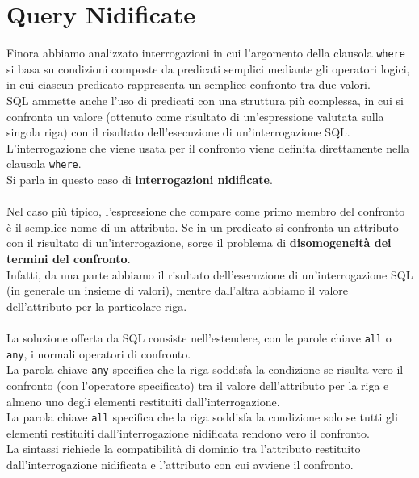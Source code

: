 \chapter{Query Nidificate}
Finora abbiamo analizzato interrogazioni in cui l'argomento della clausola \texttt{where} si basa su condizioni composte da predicati semplici mediante gli operatori logici, in cui ciascun predicato rappresenta un semplice confronto tra due valori.\\
SQL ammette anche l'uso di predicati con una struttura più complessa, in cui si confronta un valore (ottenuto come risultato di un'espressione valutata sulla singola riga) con il risultato dell'esecuzione di un'interrogazione SQL. L'interrogazione che viene usata per il confronto viene definita direttamente nella clausola \texttt{where}.\\
Si parla in questo caso di \textbf{interrogazioni nidificate}.\\\\
Nel caso più tipico, l'espressione che compare come primo membro del confronto è il semplice nome di un attributo. Se in un predicato si confronta un attributo con il risultato di un'interrogazione, sorge il problema di \textbf{disomogeneità dei termini del confronto}.\\
Infatti, da una parte abbiamo il risultato dell'esecuzione di un'interrogazione SQL (in generale un insieme di valori), mentre dall'altra abbiamo il valore dell'attributo per la particolare riga.\\\\
La soluzione offerta da SQL consiste nell'estendere, con le parole chiave \texttt{all} o \texttt{any}, i normali operatori di confronto.\\
La parola chiave \texttt{any} specifica che la riga soddisfa la condizione se risulta vero il confronto (con l'operatore specificato) tra il valore dell'attributo per la riga e almeno uno degli elementi restituiti dall'interrogazione.\\
La parola chiave \texttt{all} specifica che la riga soddisfa la condizione solo se tutti gli elementi restituiti dall'interrogazione nidificata rendono vero il confronto.\\
La sintassi richiede la compatibilità di dominio tra l'attributo restituito dall'interrogazione nidificata e l'attributo con cui avviene il confronto.

